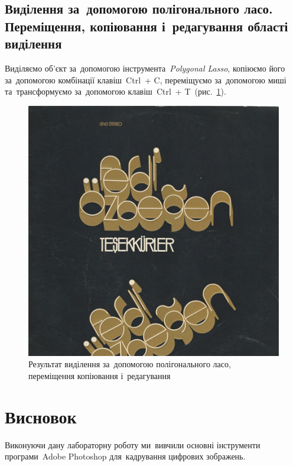 \documentclass[
	a4paper,
	oneside,
	BCOR = 10mm,
	DIV = 12,
	12pt,
	headings = normal,
]{scrartcl}
\newcommand{\key}[1]{\textsf{#1}}
\begin{document}
		\subsection{Виділення за~допомогою полігонального ласо. Переміщення, копіювання і~редагування області виділення}
			Виділяємо об'єкт за~допомогою інструмента~\emph{\textenglish{Polygonal Lasso}}, копіюємо його за~допомогою комбінації клавіш~\key{\textenglish{Ctrl}}~+ \key{\textenglish{C}}, переміщуємо за~допомогою миші та~трансформуємо за~допомогою клавіш~\key{\textenglish{Ctrl}}~+ \key{\textenglish{T}}~(рис.~\ref{fig:05-polygonal-lasso-res}).

			\begin{figure}[!htbp]
				\centering
				\includegraphics[height = 4\baselineskip]{./../01-solution/y03s01-multimedia-lab-02-02-p05.png}
				\caption{Результат виділення за~допомогою полігонального ласо, переміщення копіювання і~редагування}
				\label{fig:05-polygonal-lasso-res}
			\end{figure}

	\section{Висновок}
		Виконуючи дану лабораторну роботу ми~вивчили основні інструменти програми~\textenglish{Adobe Photoshop} для~кадрування цифрових зображень.
\end{document}
